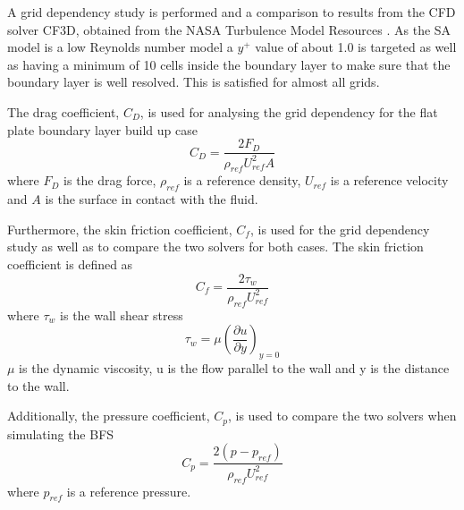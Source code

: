 A grid dependency study is performed and a comparison to results from the CFD solver CF3D, obtained from the NASA Turbulence Model Resources \cite{NASA}. As the SA model is a low Reynolds number model a $y^+$ value of about 1.0 is targeted as well as having a minimum of 10 cells inside the boundary layer to make sure that the boundary layer is well resolved. This is satisfied for almost all grids. 

The drag coefficient, $C_D$, is used for analysing the grid dependency for the flat plate boundary layer build up case
\begin{equation}
C_D=\frac{2F_D}{\rho_{ref}U^2_{ref}A}
\label{eq:CD}
\end{equation}
where $F_D$ is the drag force, $\rho_{ref}$ is a reference density, $U_{ref}$ is a reference velocity and $A$ is the surface in contact with the fluid.

Furthermore, the skin friction coefficient, $C_f$, is used for the grid dependency study as well as to compare the two solvers for both cases. The skin friction coefficient is defined as
\begin{equation}
  C_f = \frac{2\tau _w}{\rho_{ref}U^2_{ref}}
  \label{eq:CF}
\end{equation}
where $\tau _w$ is the wall shear stress
\begin{equation*}
  \tau_w = \mu \left( \frac{\partial u}{\partial y}\right)_{y=0}
\end{equation*}
$\mu$ is the dynamic viscosity, u is the flow parallel to the wall and y is the distance to the wall.

Additionally, the pressure coefficient, $C_p$, is used to compare the two solvers when simulating the BFS
\begin{equation}
  C_p = \frac{2(p-p_{ref})}{\rho_{ref}U^2_{ref}}
  \label{eq:CP}
\end{equation}
where $p_{ref}$ is a reference pressure. 
